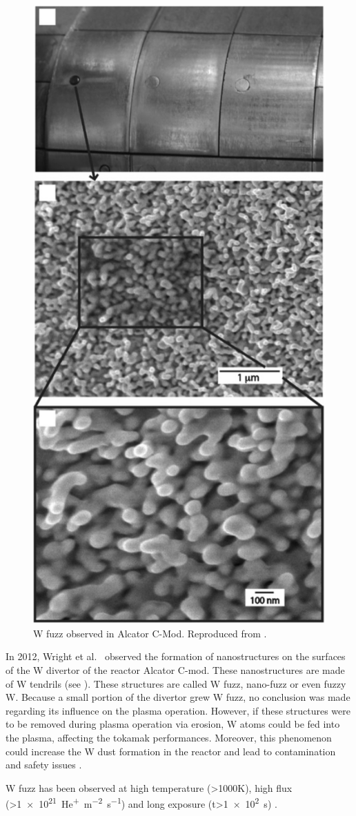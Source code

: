\begin{figure} [h!]
    \centering
    \includegraphics[width=0.5\linewidth]{Figures/Chapter1/fuzz_alcator_wright.jpg}
    \caption{W fuzz observed in Alcator C-Mod. Reproduced from \cite{wright_tungsten_2012}.}
\end{figure}

In 2012, Wright et al.\  observed the formation of nanostructures on the surfaces of the W divertor of the reactor Alcator C-mod.
These nanostructures are made of W \glspl{tendril} (see ).
These structures are called W \gls{fuzz}, nano-fuzz or even fuzzy W.
Because a small portion of the \gls{divertor} grew W \gls{fuzz}, no conclusion was made regarding its influence on the \gls{plasma} operation.
However, if these structures were to be removed during \gls{plasma} operation via erosion, W atoms could be fed into the \gls{plasma}, affecting the \gls{tokamak} performances.
Moreover, this phenomenon could increase the W dust formation in the reactor and lead to contamination and safety issues .

W \gls{fuzz} has been observed at high temperature (>1000K), high flux (>\SI{1e21}{He^+.m^{-2}.s^{-1}}) and long exposure (t>\SI{1e2}{s}) .

